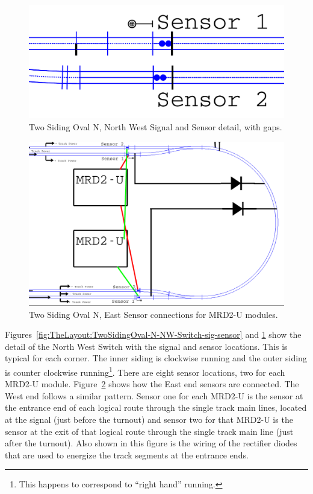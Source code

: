 \begin{figure}[hbpt]
\begin{centering}
\includegraphics[width=5in]{TwoSidingOval-N-NW-sig-sensor-detail.pdf}
\caption{Two Siding Oval N, North West Signal and Sensor detail, with gaps.}
\label{fig:TheLayout:TwoSidingOval-N-NW-sig-sensor-detail}
\end{centering}
\end{figure}
\begin{figure}[hbpt]
\begin{centering}
\includegraphics[width=5in]{TwoSidingOval-N-East-MRD2-rect.pdf}
\caption{Two Siding Oval N, East Sensor connections for MRD2-U modules.}
\label{fig:TheLayout:TwoSidingOval-N-East-MRD2-rect}
\end{centering}
\end{figure}
Figures~\ref{fig:TheLayout:TwoSidingOval-N-NW-Switch-sig-sensor} and
\ref{fig:TheLayout:TwoSidingOval-N-NW-sig-sensor-detail} show the
detail of the North West Switch with the signal and sensor locations.
This is typical for each corner. The inner siding is clockwise running
and the outer siding is counter clockwise running\footnote{This happens
to correspond to ``right hand'' running.}.  There are eight sensor
locations, two for each MRD2-U module. 
Figure~\ref{fig:TheLayout:TwoSidingOval-N-East-MRD2-rect} shows how the
East end sensors are connected.  The West end follows a similar
pattern. Sensor one for each MRD2-U is the sensor at the entrance end
of each logical route through the single track main lines, located at
the signal (just before the turnout) and sensor two for that MRD2-U is
the sensor at the exit of that logical route through the single track
main line (just after the turnout).  Also shown in this figure is the
wiring of the rectifier diodes that are used to energize the track
segments at the entrance ends.

